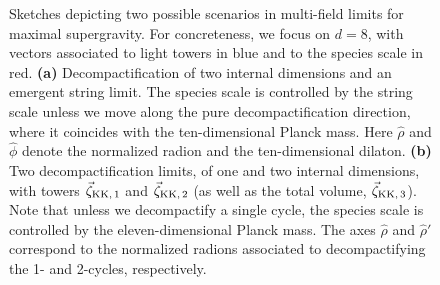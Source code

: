 \begin{figure}
	\begin{center}
        \quad
		\caption{\small Sketches depicting two possible scenarios in multi-field limits for maximal supergravity. For concreteness, we focus on $d=8$, with vectors associated to light towers in blue and to the species scale in red. \textbf{(a)} Decompactification of two internal dimensions and an emergent string limit. The species scale is controlled by the string scale unless we move along the pure decompactification direction, where it coincides with the ten-dimensional Planck mass. Here $\hat{\rho}$ and $\hat{\phi}$ denote the normalized radion and the ten-dimensional dilaton. \textbf{(b)} Two decompactification limits, of one and two internal dimensions, with towers $\vec{\zeta}_{{\rm KK},\, 1}$ and $\vec{\zeta}_{{\rm KK},\, 2}$ (as well as the total volume, $\vec{\zeta}_{{\rm KK},\, 3}$). Note that unless we decompactify a single cycle, the species scale is controlled by the eleven-dimensional Planck mass. The axes $\hat{\rho}$ and $\hat{\rho}'$ correspond to the normalized radions associated to decompactifying the 1- and 2-cycles, respectively.\label{fig:MT2radions} }
	\end{center}
\end{figure}
	
